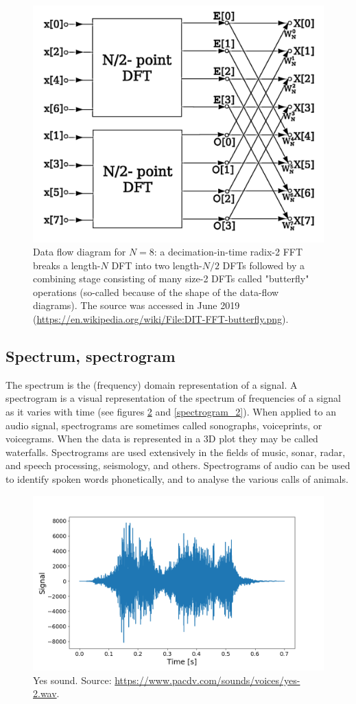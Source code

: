 \documentclass[12pt]{article}
\theoremstyle{plain}
\begin{document}
\begin{figure}[h!]
    \centering
	\includegraphics[width=.7\linewidth]{media/DIT-FFT-butterfly.png}
	\caption{Data flow diagram for $N=8$: a decimation-in-time radix-2 FFT breaks a length-$N$ DFT into two length-$N/2$ DFTs followed by a combining stage consisting of many size-2 DFTs called "butterfly" operations (so-called because of the shape of the data-flow diagrams). The source was accessed in June 2019 (\url{https://en.wikipedia.org/wiki/File:DIT-FFT-butterfly.png}).}
	\label{radix_fig}
\end{figure}

\subsection{Spectrum, spectrogram}

The spectrum is the (frequency) domain representation of a signal. A spectrogram is a visual representation of the spectrum of frequencies of a signal as it varies with time (see figures \ref{spectrogram_1} and \ref{spectrogram_2}). When applied to an audio signal, spectrograms are sometimes called sonographs, voiceprints, or voicegrams. When the data is represented in a 3D plot they may be called waterfalls. Spectrograms are used extensively in the fields of music, sonar, radar, and speech processing, seismology, and others. Spectrograms of audio can be used to identify spoken words phonetically, and to analyse the various calls of animals.

\begin{figure}[h!]
    \centering
	\includegraphics[width=.9\linewidth]{media/yes_sound_time.png}
	\caption{Yes sound. Source: \url{https://www.pacdv.com/sounds/voices/yes-2.wav}.}
	\label{spectrogram_1}
\end{figure}
\end{document}
